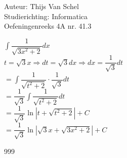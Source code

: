 \documentclass[a4paper]{article}
\newcommand{\dint}{\displaystyle\int}
\begin{document}
  
\noindent \large Auteur: Thijs Van Schel \\
\noindent \large Studierichting: Informatica\\
\noindent \large Oefeningenreeks 4A nr. 41.3\\

\medskip

\normalsize

$\dint\dfrac{1}{\sqrt{3x^2+2}} dx$\\

$t = \sqrt{3}x \Rightarrow dt = \sqrt{3} dx \Rightarrow dx = \dfrac{1}{\sqrt{3}} dt$\\

$= \dint \dfrac{1}{\sqrt{t^2+2}} \cdot \dfrac{1}{\sqrt{3}} dt$\\

$= \dfrac{1}{\sqrt{3}} \dint \dfrac{1}{\sqrt{t^2+2}} dt$\\

$= \dfrac{1}{\sqrt{3}} \ln|t + \sqrt{t^2+2}| + C$\\

$= \dfrac{1}{\sqrt{3}} \ln|\sqrt{3}x + \sqrt{3x^2+2}| + C$\\

\begin{thebibliography}{999}
\end{thebibliography}
\end{document}
